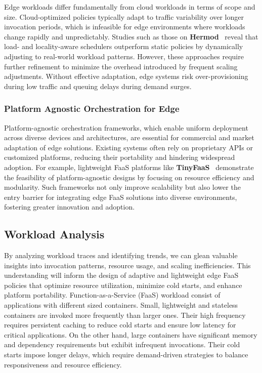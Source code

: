Edge workloads differ fundamentally from cloud workloads in terms of scope and size. Cloud-optimized policies typically adapt to traffic variability over longer invocation periods, which is infeasible for edge environments where workloads change rapidly and unpredictably. Studies such as those on \textbf{Hermod}~\cite{kostis_hermod_2022} reveal that load- and locality-aware schedulers outperform static policies by dynamically adjusting to real-world workload patterns. However, these approaches require further refinement to minimize the overhead introduced by frequent scaling adjustments. Without effective adaptation, edge systems risk over-provisioning during low traffic and queuing delays during demand surges.

\subsubsection{Platform Agnostic Orchestration for Edge}

Platform-agnostic orchestration frameworks, which enable uniform deployment across diverse devices and architectures, are essential for commercial and market adaptation of edge solutions. Existing systems often rely on proprietary APIs or customized platforms, reducing their portability and hindering widespread adoption. For example, lightweight FaaS platforms like \textbf{TinyFaaS}~\cite{pfandzelter_tinyfaas_2020} demonstrate the feasibility of platform-agnostic designs by focusing on resource efficiency and modularity. Such frameworks not only improve scalability but also lower the entry barrier for integrating edge FaaS solutions into diverse environments, fostering greater innovation and adoption.




\subsection{Workload Analysis}\label{sec:work_anly}
By analyzing workload traces and identifying trends, we can glean valuable insights into invocation patterns, resource usage, and scaling inefficiencies. This understanding will inform the design of adaptive and lightweight edge FaaS policies that optimize resource utilization, minimize cold starts, and enhance platform portability. 
Function-as-a-Service (FaaS) workload consist of applications with different sized containers.
Small, lightweight and stateless containers are invoked more frequently than larger ones. Their high frequency requires persistent caching to reduce cold starts and ensure low latency for critical applications. 
On the other hand, large containers have significant memory and dependency requirements but exhibit infrequent invocations. Their cold starts impose longer delays, which require demand-driven strategies to balance responsiveness and resource efficiency. 


